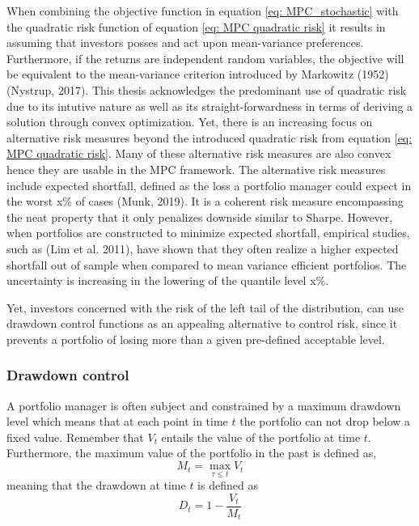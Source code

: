 When combining the objective function in equation \ref{eq: MPC_stochastic} with the quadratic risk function of equation \ref{eq: MPC quadratic risk} it results in assuming that investors posses and act upon mean-variance preferences. Furthermore, if the returns are independent random variables, the objective will be equivalent to the mean-variance criterion introduced by Markowitz (1952) (Nystrup, 2017). This thesis acknowledges the predominant use of quadratic risk due to its intutive nature as well as its straight-forwardness in terms of deriving a solution through convex optimization. Yet, there is an increasing focus on alternative risk measures beyond the introduced quadratic risk from equation \ref{eq: MPC quadratic risk}. Many of these alternative risk measures are also convex hence they are usable in the MPC framework. The alternative risk measures include expected shortfall, defined as the loss a portfolio manager could expect in the worst x\% of cases (Munk, 2019). It is a coherent risk measure encompassing the neat property that it only penalizes downside similar to Sharpe. However, when portfolios are constructed to minimize expected shortfall, empirical studies, such as (Lim et al. 2011), have shown that they often realize a higher expected shortfall out of sample when compared to mean variance efficient portfolios. The uncertainty is increasing in the lowering of the quantile level x\%. 

Yet, investors concerned with the risk of the left tail of the distribution, can use drawdown control functions as an appealing alternative to control risk, since it prevents a portfolio of losing more than a given pre-defined acceptable level. 

\subsubsection{Drawdown control}
A portfolio manager is often subject and constrained by a maximum drawdown level which means that at each point in time $t$ the portfolio can not drop below a fixed value. Remember that $V_t$ entails the value of the portfolio at time $t$. Furthermore, the maximum value of the portfolio in the past is defined as,
\begin{equation}
    M_t = \max_{\tau \leq t} V_t
\end{equation}
meaning that the drawdown at time $t$ is defined as 
\begin{equation}
    D_t = 1 - \frac{V_t}{M_t}
\end{equation}

